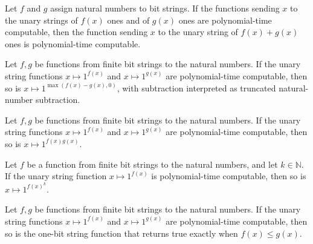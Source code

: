 \begin{theorem}
\label{Complexity.FormulaKit.polyTimeComputable_unary_add}
\leanok
{}
Let $f$ and $g$ assign natural numbers to bit strings. If the functions sending $x$ to
the unary strings of $f(x)$ ones and of $g(x)$ ones are polynomial-time computable, then
the function sending $x$ to the unary string of $f(x)+g(x)$ ones is polynomial-time
computable.
\end{theorem}

\begin{theorem}
\label{Complexity.FormulaKit.polyTimeComputable_unary_sub}
\leanok
{}
Let $f,g$ be functions from finite bit strings to the natural numbers. If the unary
string functions $x\mapsto 1^{f(x)}$ and $x\mapsto 1^{g(x)}$ are polynomial-time
computable, then so is $x\mapsto 1^{\max(f(x)-g(x),0)}$, with subtraction interpreted as
truncated natural-number subtraction.
\end{theorem}

\begin{theorem}
\label{Complexity.FormulaKit.polyTimeComputable_unary_mul}
\leanok
{}
Let $f,g$ be functions from finite bit strings to the natural numbers. If the unary
string functions $x\mapsto 1^{f(x)}$ and $x\mapsto 1^{g(x)}$ are polynomial-time
computable, then so is $x\mapsto 1^{f(x)g(x)}$.
\end{theorem}

\begin{theorem}
\label{Complexity.FormulaKit.polyTimeComputable_unary_pow}
\leanok
{}
Let $f$ be a function from finite bit strings to the natural numbers, and let
$k\in\mathbb N$. If the unary string function $x\mapsto 1^{f(x)}$ is polynomial-time
computable, then so is $x\mapsto 1^{f(x)^k}$.
\end{theorem}

\begin{theorem}
\label{Complexity.FormulaKit.polyTimeComputable_unary_le}
\leanok
{}
Let $f,g$ be functions from finite bit strings to the natural numbers. If the unary
string functions $x\mapsto 1^{f(x)}$ and $x\mapsto 1^{g(x)}$ are polynomial-time
computable, then so is the one-bit string function that returns true exactly when
$f(x)\le g(x)$.
\end{theorem}


